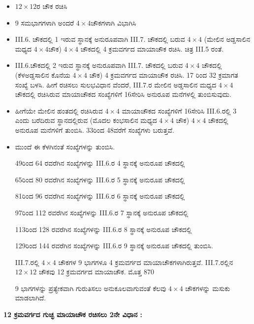 \begin{itemize}
	\item $12 \times 12$ರ ಚೌಕ ರಚಿಸಿ
	\item 9 ಸಮಭಾಗಗಳಾಗಿ ಅಂದರೆ $4 \times 4$ಚೌಕಗಳಾಗಿ ವಿಭಾಗಿಸಿ
	\item  III.6. ಚೌಕದಲ್ಲಿ 1 ಇರುವ ಸ್ಥಾನಕ್ಕೆ ಅನುರೂಪವಾಗಿ  III.7. ಚೌಕದಲ್ಲಿ ಬರುವ $4 \times 4$ (ಮೇಲಿನ ಅಡ್ಡಸಾಲಿನ ಮಧ್ಯದ $4 \times 4$ಚೌಕ) $4 \times 4$ ಚೌಕದಲ್ಲಿ 4 ಕ್ರಮವರ್ಗದ ಮಾಯಾಚೌಕ ರಚಿಸಿ. ಚಿತ್ರ  III.5 ರಂತೆ.
	\item  III.6.ಚೌಕದಲ್ಲಿ 2 ಇರುವ ಸ್ಥಾನಕ್ಕೆ ಅನುರೂಪವಾಗಿ  III.7. ಚೌಕದಲ್ಲಿ ಬರುವ $4 \times 4$ ಚೌಕದಲ್ಲಿ (ಕೆಳಅಡ್ಡಸಾಲಿನ ಕೊನೆಯ $4 \times 4$ ಚೌಕ) 4 ಕ್ರಮವರ್ಗದ ಮಾಯಾಚೌಕ 
	ರಚಿಸಿ. 17 ರಿಂದ 32 ಕ್ರಮಾಗತ ಸಂಖ್ಯೆ ಬಳಸಿ. ಹೀಗೆ ರಚಿಸಲು ಸುಲಭವಿಧಾನ ವೆಂದರೆ,  III.7.ರ ಮೇಲಿನ ಅಡ್ಡಸಾಲಿನ ಮಧ್ಯದ $4 \times 4$ ಚೌಕದಲ್ಲಿ ರಚಿಸಿರುವ ಮಾಯಾಚೌಕದ ಸಂಖ್ಯೆಗಳಿಗೆ 16ಸೇರಿಸಿ ಅನುರೂಪ ಮನೆಗಳಲ್ಲಿ ತುಂಬಿಸುವುದು.
	\item ಹೀಗೆಯೇ ಮೇಲಿನ ಹಂತದಲ್ಲಿ ರಚಿಸಿರುವ $4 \times 4$ ಮಾಯಾಚೌಕದ ಸಂಖ್ಯೆಗಳಿಗೆ 16ಸೇರಿಸಿ  III.6.ರಲ್ಲಿ 3 ಎಂದು ಬರೆದಿರುವ ಸ್ಥಾನದಲ್ಲಿರುವ (ಮೊದಲ ಕಂಭಸಾಲಿನ ಮಧ್ಯದ $4 \times 4$ ಚೌಕ) $4 \times 4$ ಚೌಕದಲ್ಲಿ ಅನುರೂಪ ಮನೆಗಳಿಗೆ ತುಂಬಿಸಿ. 33ರಿಂದ 48ವರೆಗೆ ಸಂಖ್ಯೆಗಳು ಬರುತ್ತವೆ.
	\item ಮುಂದೆ ಈ ಕೆಳಗಿನಂತೆ ಸಂಖ್ಯೆಗಳನ್ನು ತುಂಬಿಸಿ.

	49ರಿಂದ 64 ರವರೆಗಿನ ಸಂಖ್ಯೆಗಳನ್ನು  III.6.ರ 4 ಸ್ಥಾನಕ್ಕೆ ಅನುರೂಪ ಚೌಕದಲ್ಲಿ

	65ರಿಂದ 80 ರವರೆಗಿನ ಸಂಖ್ಯೆಗಳನ್ನು  III.6.ರ 5 ಸ್ಥಾನಕ್ಕೆ ಅನುರೂಪ ಚೌಕದಲ್ಲಿ

	81ರಿಂದ 96 ರವರೆಗಿನ ಸಂಖ್ಯೆಗಳನ್ನು  III.6.ರ 6 ಸ್ಥಾನಕ್ಕೆ ಅನುರೂಪ ಚೌಕದಲ್ಲಿ

	97ರಿಂದ 112 ರವರೆಗಿನ ಸಂಖ್ಯೆಗಳನ್ನು  III.6.ರ 7 ಸ್ಥಾನಕ್ಕೆ ಅನುರೂಪ ಚೌಕದಲ್ಲಿ

	113ರಿಂದ 128 ರವರೆಗಿನ ಸಂಖ್ಯೆಗಳನ್ನು  III.6.ರ 8 ಸ್ಥಾನಕ್ಕೆ ಅನುರೂಪ ಚೌಕದಲ್ಲಿ

	129ರಿಂದ 144 ರವರೆಗಿನ ಸಂಖ್ಯೆಗಳನ್ನು  III.6.ರ 9 ಸ್ಥಾನಕ್ಕೆ ಅನುರೂಪ ಚೌಕದಲ್ಲಿ ತುಂಬಿಸಿ.

\newpage

	III.7.ರಲ್ಲಿ $4 \times 4$ ಚೌಕಗಳ 9 ಭಾಗಗಳೂ 4 ಕ್ರಮವರ್ಗದ ಮಾಯಾಚೌಕಗಳಾಗಿ\-ರುತ್ತವೆ.  III.7.ರಲ್ಲಿನ $12 \times 12$ ಚೌಕವು 12 ಕ್ರಮವರ್ಗದ ಮಾಯಾಚೌಕ. ಮೊತ್ತ 870

	9 ಭಾಗಗಳನ್ನು ಪ್ರತ್ಯೇಕವಾಗಿ ಗುರುತಿಸಲು ಅನುಕೂಲವಾಗುವಂತೆ ಕೆಲವು $4 \times 4$ ಚೌಕಗಳನ್ನು ಮಸುಕು ಮಾಡಲಾಗಿದೆ.
\end{itemize}

\smallskip
\textbf{12 ಕ್ರಮವರ್ಗದ ಗುಚ್ಛ ಮಾಯಾಚೌಕ ರಚಿಸಲು 2ನೇ ವಿಧಾನ :}
\smallskip


